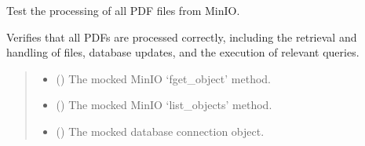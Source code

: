 \documentclass[letterpaper,10pt,english]{sphinxmanual}
\begin{document}
\begin{fulllineitems}
\label{\detokenize{test.data_storage:test.data_storage.test_paragraph_extraction.test_process_all_pdfs}}
\pysigstartsignatures
\pysiglinewithargsret
{}
{\sphinxparamcomma {}\sphinxparamcomma {}}
{}
\pysigstopsignatures
\sphinxAtStartPar
Test the processing of all PDF files from MinIO.

\sphinxAtStartPar
Verifies that all PDFs are processed correctly, including the retrieval and handling
of files, database updates, and the execution of relevant queries.
\begin{quote}\begin{description}
\begin{itemize}
\item {} 
\sphinxAtStartPar
{} () \textendash{} The mocked MinIO ‘fget\_object’ method.

\item {} 
\sphinxAtStartPar
{} () \textendash{} The mocked MinIO ‘list\_objects’ method.

\item {} 
\sphinxAtStartPar
{} () \textendash{} The mocked database connection object.

\end{itemize}

\end{description}\end{quote}

\end{fulllineitems}

\end{document}
